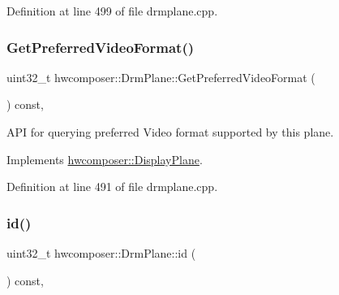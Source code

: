 Definition at line 499 of file drmplane.\+cpp.


\begin{DoxyCode}{0}
\end{DoxyCode}
\mbox{\label{classhwcomposer_1_1DrmPlane_a061caae8c703189ae6d05dbe8b303f12}} 
\subsubsection{\texorpdfstring{Get\+Preferred\+Video\+Format()}{GetPreferredVideoFormat()}}
{\footnotesize\ttfamily uint32\+\_\+t hwcomposer\+::\+Drm\+Plane\+::\+Get\+Preferred\+Video\+Format (\begin{DoxyParamCaption}{ }\end{DoxyParamCaption}) const\hspace{0.3cm}{\ttfamily [override]}, {\ttfamily [virtual]}}

A\+PI for querying preferred Video format supported by this plane. 

Implements \mbox{\hyperlink{classhwcomposer_1_1DisplayPlane_aab8aae5944b1107e4efc9d0d79c43c40}{hwcomposer\+::\+Display\+Plane}}.



Definition at line 491 of file drmplane.\+cpp.


\begin{DoxyCode}{0}
\end{DoxyCode}
\mbox{\label{classhwcomposer_1_1DrmPlane_ae84fc513bfb1f3ee35715ff9a808f447}} 
\subsubsection{\texorpdfstring{id()}{id()}}
{\footnotesize\ttfamily uint32\+\_\+t hwcomposer\+::\+Drm\+Plane\+::id (\begin{DoxyParamCaption}{ }\end{DoxyParamCaption}) const\hspace{0.3cm}{\ttfamily [override]}, {\ttfamily [virtual]}}




